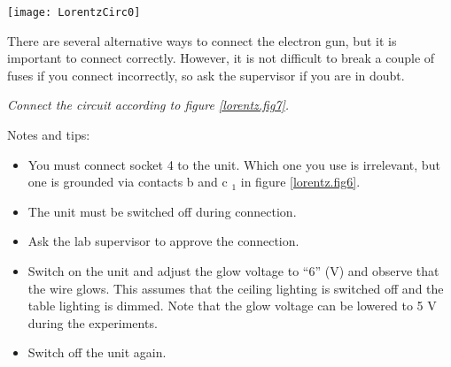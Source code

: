 \documentclass[../Elmag-labhefte-2020.tex]{subfiles}
\begin{document}
\begin{marginfigure}[-2cm]%
  \centering
    \texttt{[image: LorentzCirc0]}
    \caption{%
      Wiring diagram for the apparauts' side panel.\\
      a: Anode\\
      b: Cathode\\
      c: Cathode heating\\
      d: Wehnelt cylinder\\
      e: Deflection plates\\
      f: Anode, for symmetrical adjustment of the deflection voltage\\
      g: Helmholtz coils
    }
    \label{lorentz.fig6}
\end{marginfigure}

There are several alternative ways to connect the electron gun, but it is important to connect correctly. However, it is not difficult to break a couple of fuses if you connect incorrectly, so ask the supervisor if you are in doubt.

\emph{Connect the circuit according to figure \ref{lorentz.fig7}.}

Notes and tips:
\begin{itemize}
    \item You must connect socket 4 to the unit. Which one you use is irrelevant, but one is grounded via contacts b and c $_1$ in figure \ref{lorentz.fig6}.
    \item The unit must be switched off during connection.
    \item Ask the lab supervisor to approve the connection.
    \item Switch on the unit and adjust the glow voltage to ``6'' (V) and observe that the wire glows. This assumes that the ceiling lighting is switched off and the table lighting is dimmed. Note that the glow voltage can be lowered to 5 V during the experiments.
    \item Switch off the unit again.
\end{itemize}
\end{document}
